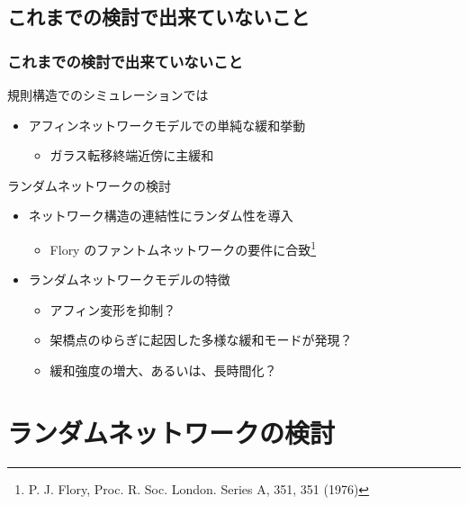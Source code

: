 \documentclass[12pt, dvipdfmx]{beamer}
\begin{document}
\subsection{これまでの検討で出来ていないこと}
\begin{frame}
	\frametitle{これまでの検討で出来ていないこと}
		\begin{alertblock}{規則構造でのシミュレーションでは}
			\begin{itemize}
				\item アフィンネットワークモデルでの単純な緩和挙動 
				\begin{itemize}
					\item ガラス転移終端近傍に主緩和
				\end{itemize}
			\end{itemize}
		\end{alertblock}
		\begin{block}{ランダムネットワークの検討}
			\begin{itemize}
				\item ネットワーク構造の連結性にランダム性を導入
                    \begin{itemize}
						\item Flory のファントムネットワークの要件に合致\footnote{
							P. J. Flory, Proc. R. Soc. London. Series A, 351, 351 (1976)
						}
					\end{itemize}
				\item ランダムネットワークモデルの特徴
				\begin{itemize}
					\item アフィン変形を抑制？
					\item 架橋点のゆらぎに起因した多様な緩和モードが発現？
					\item 緩和強度の増大、あるいは、長時間化？
				\end{itemize}
			\end{itemize}
		\end{block}
\end{frame}

\section{ランダムネットワークの検討}
\end{document}

